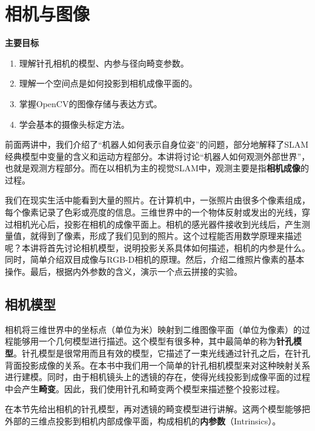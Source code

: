 \chapter{相机与图像}
\label{cpt:5}
\begin{mdframed}  
	\textbf{主要目标}
	\begin{enumerate}[labelindent=0em,leftmargin=1.5em]
		\item 理解针孔相机的模型、内参与径向畸变参数。
		\item 理解一个空间点是如何投影到相机成像平面的。
		\item 掌握OpenCV的图像存储与表达方式。
		\item 学会基本的摄像头标定方法。
	\end{enumerate}
\end{mdframed} 

前面两讲中，我们介绍了“机器人如何表示自身位姿”的问题，部分地解释了SLAM经典模型中变量的含义和运动方程部分。本讲将讨论“机器人如何观测外部世界”，也就是观测方程部分。而在以相机为主的视觉SLAM中，观测主要是指\textbf{相机成像}的过程。

我们在现实生活中能看到大量的照片。在计算机中，一张照片由很多个像素组成，每个像素记录了色彩或亮度的信息。三维世界中的一个物体反射或发出的光线，穿过相机光心后，投影在相机的成像平面上。相机的感光器件接收到光线后，产生测量值，就得到了像素，形成了我们见到的照片。这个过程能否用数学原理来描述呢？本讲将首先讨论相机模型，说明投影关系具体如何描述，相机的内参是什么。同时，简单介绍双目成像与RGB-D相机的原理。然后，介绍二维照片像素的基本操作。最后，根据内外参数的含义，演示一个点云拼接的实验。
\newpage


\newpage

\section{相机模型}
相机将三维世界中的坐标点（单位为米）映射到二维图像平面（单位为像素）的过程能够用一个几何模型进行描述。这个模型有很多种，其中最简单的称为\textbf{针孔模型}。针孔模型是很常用而且有效的模型，它描述了一束光线通过针孔之后，在针孔背面投影成像的关系。在本书中我们用一个简单的针孔相机模型来对这种映射关系进行建模。同时，由于相机镜头上的透镜的存在，使得光线投影到成像平面的过程中会产生\textbf{畸变}。因此，我们使用针孔和畸变两个模型来描述整个投影过程。

在本节先给出相机的针孔模型，再对透镜的畸变模型进行讲解。这两个模型能够把外部的三维点投影到相机内部成像平面，构成相机的\textbf{内参数}（Intrinsics）。


